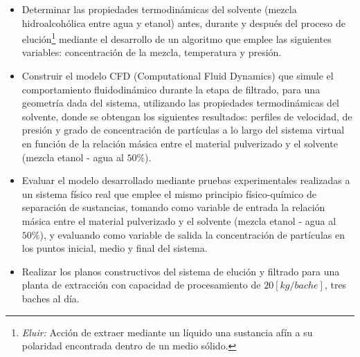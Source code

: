 \begin{itemize}
	\item Determinar las propiedades termodin\'amicas del solvente (mezcla hidroalcoh\'olica entre agua y etanol) antes, durante y despu\'es del proceso de eluci\'on\footnote{\textit{Eluir:} Acci\'on de extraer mediante un l\'iquido una sustancia af\'in a su polaridad encontrada dentro de un medio s\'olido.} mediante el desarrollo de un algoritmo que emplee las siguientes variables: concentraci\'on de la mezcla, temperatura y presi\'on.
	\item Construir el modelo CFD (Computational Fluid Dynamics) que simule el comportamiento fluidodin\'amico durante la etapa de filtrado, para una geometr\'ia dada del sistema, utilizando las propiedades termodin\'amicas del solvente, donde se obtengan los siguientes resultados: perfiles de velocidad, de presi\'on y grado de concentraci\'on de part\'iculas a lo largo del sistema virtual en funci\'on de la relaci\'on m\'asica entre el material pulverizado y el solvente (mezcla etanol - agua al $50\%$).
	\item Evaluar el modelo desarrollado mediante pruebas experimentales realizadas a un sistema f\'isico real que emplee el mismo principio f\'isico-qu\'imico de separaci\'on de sustancias, tomando como variable de entrada la relaci\'on m\'asica entre el material pulverizado y el solvente (mezcla etanol - agua al $50\%$), y evaluando como variable de salida la concentraci\'on de part\'iculas en los puntos inicial, medio y final del sistema.
	\item Realizar los planos constructivos del sistema de eluci\'on y filtrado para una planta de extracci\'on con capacidad de procesamiento de $20 \left[kg / bache \right]$, tres baches al d\'ia.
\end{itemize}